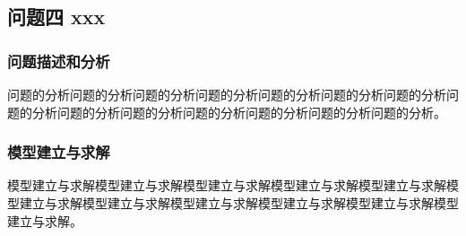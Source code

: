 \subsection{问题四 xxx}
\subsubsection{问题描述和分析}
问题的分析问题的分析问题的分析问题的分析问题的分析问题的分析问题的分析问题的分析问题的分析问题的分析问题的分析问题的分析问题的分析问题的分析。
\subsubsection{模型建立与求解}
模型建立与求解模型建立与求解模型建立与求解模型建立与求解模型建立与求解模型建立与求解模型建立与求解模型建立与求解模型建立与求解模型建立与求解模型建立与求解。
